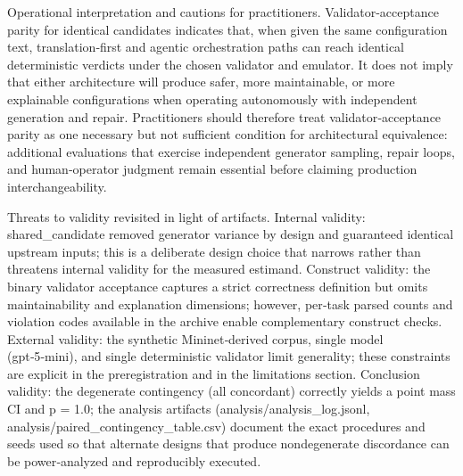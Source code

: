 \documentclass[conference]{IEEEtran}
\begin{document}
Operational interpretation and cautions for practitioners. Validator‑acceptance parity for identical candidates indicates that, when given the same configuration text, translation‑first and agentic orchestration paths can reach identical deterministic verdicts under the chosen validator and emulator. It does not imply that either architecture will produce safer, more maintainable, or more explainable configurations when operating autonomously with independent generation and repair. Practitioners should therefore treat validator‑acceptance parity as one necessary but not sufficient condition for architectural equivalence: additional evaluations that exercise independent generator sampling, repair loops, and human‑operator judgment remain essential before claiming production interchangeability.

Threats to validity revisited in light of artifacts. Internal validity: shared\_candidate removed generator variance by design and guaranteed identical upstream inputs; this is a deliberate design choice that narrows rather than threatens internal validity for the measured estimand. Construct validity: the binary validator acceptance captures a strict correctness definition but omits maintainability and explanation dimensions; however, per‑task parsed counts and violation codes available in the archive enable complementary construct checks. External validity: the synthetic Mininet‑derived corpus, single model (gpt‑5‑mini), and single deterministic validator limit generality; these constraints are explicit in the preregistration and in the limitations section. Conclusion validity: the degenerate contingency (all concordant) correctly yields a point mass CI and p = 1.0; the analysis artifacts (analysis/analysis\_log.jsonl, analysis/paired\_contingency\_table.csv) document the exact procedures and seeds used so that alternate designs that produce nondegenerate discordance can be power‑analyzed and reproducibly executed.
\end{document}
